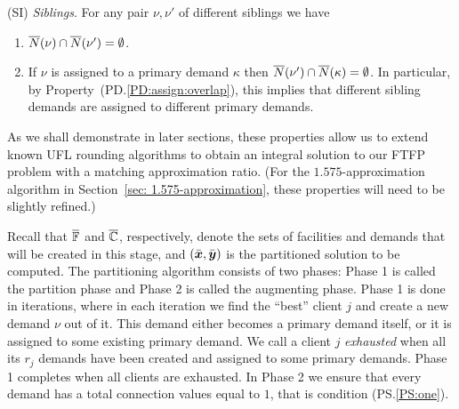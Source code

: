 \documentclass{llncs}
\begin{document}
\begin{description}
\begin{enumerate}
\begin{enumerate}
			\end{enumerate}

	\end{enumerate}
	
\item{(SI)} \emph{Siblings}. For any pair $\nu,\nu'$ of different siblings we have
  \begin{enumerate}

	\item \label{SI:siblings disjoint}
		  ${\overline{N}}(\nu)\cap {\overline{N}}(\nu') = \emptyset$.
		
	\item \label{SI:primary disjoint} If $\nu$ is assigned to a primary demand $\kappa$ then
 		${\overline{N}}(\nu')\cap {\overline{N}}(\kappa) = \emptyset$. In particular, by Property~(PD.\ref{PD:assign:overlap}),
		this implies that different sibling demands are assigned to different primary demands.

	\end{enumerate}
	
\end{description}

As we shall demonstrate in later sections, these properties allow us
to extend known UFL rounding algorithms to obtain an integral solution
to our FTFP problem with a matching approximation ratio. (For the
$1.575$-approximation algorithm in Section~\ref{sec:
  1.575-approximation}, these properties will need to be slightly
refined.)


 Recall that
$\overline{\mathbb{F}}$ and $\overline{\mathbb{C}}$, respectively, denote the
sets of facilities and demands that will be created in this
stage, and $(\bar{\boldsymbol{x}},\bar{\boldsymbol{y}})$ is the partitioned solution
to be computed. 
The  partitioning algorithm consists of two phases:
Phase 1 is called the partition phase and Phase 2 is called
the augmenting phase. Phase 1 is done in iterations, where
in each iteration we find the ``best'' client $j$ and create a
new demand $\nu$ out of it. This demand either becomes a
primary demand itself, or it is assigned to some existing
primary demand. We call a client $j$ \emph{exhausted} when
all its $r_j$ demands have been created and assigned to some
primary demands. Phase 1 completes when all clients are
exhausted. In Phase 2 we ensure that every demand has a
total connection values equal to $1$, that is condition (PS.\ref{PS:one}).
\end{document}
